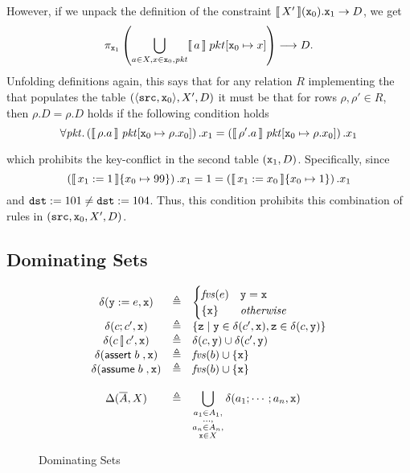 However, if we unpack the definition of the constraint
$\llbracket\,X'\,\rrbracket(\texttt{x}_0).\texttt{x}_1 \to D$, we get
\[\pi_{\texttt{x}_1}\left(\bigcup_{a \in X, x \in
      \texttt{x}_0,\mathit{pkt}} \llbracket\,a\,\rrbracket\; pkt[\texttt{x}_0 \mapsto x]
  \right) \longrightarrow D.\] Unfolding definitions again, this says
that for any relation $R$ implementing the that populates the table
$(\langle\texttt{src},\texttt{x}_0\rangle, X', D)$ it must be that for
rows $\rho, \rho' \in R$, then $\rho.D = \rho.D$ holds if the
following condition holds
\[\forall \mathit{pkt}. \left(\llbracket\,\rho.a\,\rrbracket\; \mathit{pkt}[\texttt{x}_0 \mapsto
    \rho.x_0 ]\right).x_1 =
  \left(\llbracket\,\rho'.a\,\rrbracket\;\mathit{pkt}[\texttt{x}_0\mapsto \rho.x_0
    ]\right).x_1\]

which prohibits the key-conflict in the second table
$(\texttt{x}_1,D)$. Specifically, since
\[\left(\llbracket\,x_1:=1\,\rrbracket \{x_0 \mapsto 99\}\right).x_1 = 1 =
  \left(\llbracket\,x_1:=x_0\,\rrbracket \{x_0 \mapsto 1\}\right).x_1\] and
$\texttt{dst} := 101 \neq \texttt{dst} := 104$. Thus, this condition
prohibits this combination of rules in
$(\texttt{src}, \texttt{x}_0, X', D)$.


\subsection{Dominating Sets}

\begin{figure}[tpb]
  \[\begin{array}{c>{\triangleq}cl}
      \delta(\var y := e,\var x) && \begin{cases}
        \fvs(e) &\var y = \var x\\
        \{\var x\} & \textit{otherwise} \end{cases} \\
      \delta(c;c', \var x) && \left\{\var z \mid \var y \in \delta(c', \var x), \var z \in \delta(c, \var y)\right\} \\
      \delta(c\angel c', \var x) && \delta (c, \var y) \cup \delta(c', \var y) \\
      \delta(\assert b, \var x) && \fvs(b) \cup \{\var x\} \\
      \delta(\assume b, \var x) && \fvs(b) \cup \{\var x\} \\\\
      \Delta(\vec A, X) && \displaystyle\bigcup_{\substack{a_1\in A_1,\\\ldots,\\ a_n \in A_n, \\\var x \in X}}\delta(a_1;\cdots; a_n,\var x)                      
    \end{array}\]
  \caption{Dominating Sets}
  \label{fig:dominating-sets }
\end{figure}


